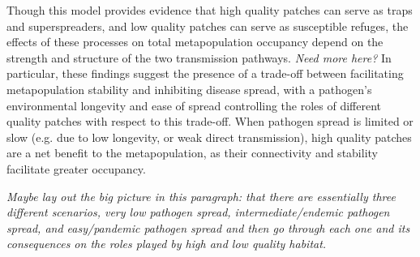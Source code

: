 \documentclass{svjour3}
\begin{document}
%

Though this model provides evidence that high quality patches can serve as traps and superspreaders, and low quality patches can serve as susceptible refuges, the effects of these processes on total metapopulation occupancy depend on the strength and structure of the two transmission pathways.  \emph{Need more here?}  In particular, these findings suggest the presence of a trade-off between facilitating metapopulation stability and inhibiting disease spread, with a pathogen's environmental longevity and ease of spread controlling the roles of different quality patches with respect to this trade-off.  When pathogen spread is limited or slow (e.g. due to low longevity, or weak direct transmission), high quality patches are a net benefit to the metapopulation, as their connectivity and stability facilitate greater occupancy.  

\emph{Maybe lay out the big picture in this paragraph: that there are essentially three different scenarios, very low pathogen spread, intermediate/endemic pathogen spread, and easy/pandemic pathogen spread and then go through each one and its consequences on the roles played by high and low quality habitat.}
\end{document}
